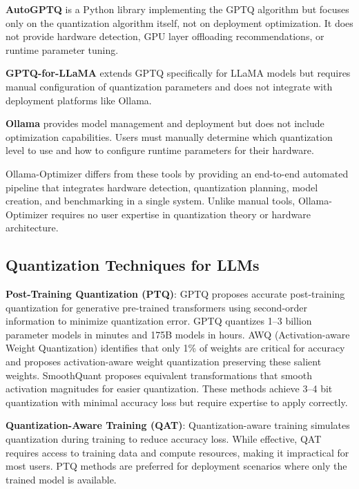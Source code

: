 \documentclass[journal]{IEEEtran}
\begin{document}
\textbf{AutoGPTQ} \cite{frantar2022} is a Python library implementing the GPTQ algorithm but focuses only on the quantization algorithm itself, not on deployment optimization. It does not provide hardware detection, GPU layer offloading recommendations, or runtime parameter tuning.

\textbf{GPTQ-for-LLaMA} extends GPTQ specifically for LLaMA models but requires manual configuration of quantization parameters and does not integrate with deployment platforms like Ollama.

\textbf{Ollama} provides model management and deployment but does not include optimization capabilities. Users must manually determine which quantization level to use and how to configure runtime parameters for their hardware.

Ollama-Optimizer differs from these tools by providing an end-to-end automated pipeline that integrates hardware detection, quantization planning, model creation, and benchmarking in a single system. Unlike manual tools, Ollama-Optimizer requires no user expertise in quantization theory or hardware architecture.

\subsection{Quantization Techniques for LLMs}

\textbf{Post-Training Quantization (PTQ)}: GPTQ \cite{frantar2022} proposes accurate post-training quantization for generative pre-trained transformers using second-order information to minimize quantization error. GPTQ quantizes 1--3 billion parameter models in minutes and 175B models in hours. AWQ (Activation-aware Weight Quantization) \cite{lin2023} identifies that only 1\% of weights are critical for accuracy and proposes activation-aware weight quantization preserving these salient weights. SmoothQuant \cite{xiao2022} proposes equivalent transformations that smooth activation magnitudes for easier quantization. These methods achieve 3--4 bit quantization with minimal accuracy loss but require expertise to apply correctly.

\textbf{Quantization-Aware Training (QAT)}: Quantization-aware training \cite{jacob2018} simulates quantization during training to reduce accuracy loss. While effective, QAT requires access to training data and compute resources, making it impractical for most users. PTQ methods are preferred for deployment scenarios where only the trained model is available.
\end{document}
